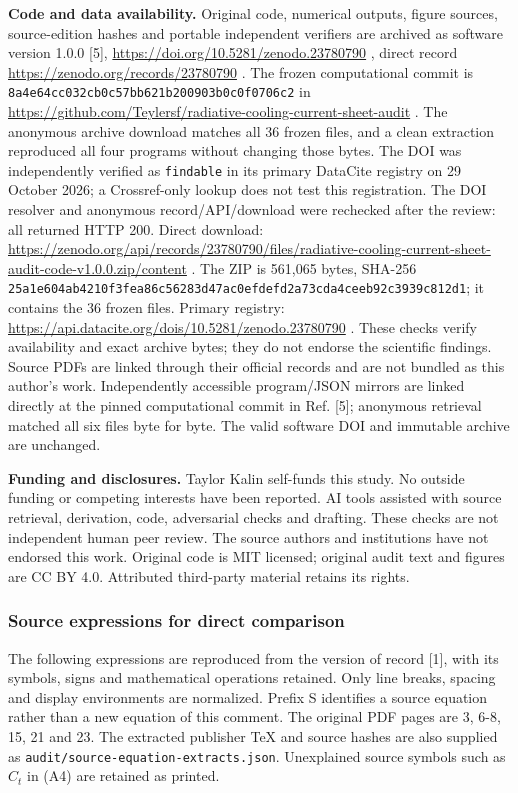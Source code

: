 \textbf{Code and data availability.} Original code, numerical outputs,
figure sources, source-edition hashes and portable independent verifiers
are archived as software version 1.0.0 {[}5{]},
\url{https://doi.org/10.5281/zenodo.23780790} , direct record
\url{https://zenodo.org/records/23780790} . The frozen computational
commit is \nolinkurl{8a4e64cc032cb0c57bb621b200903b0c0f0706c2} in
\url{https://github.com/Teylersf/radiative-cooling-current-sheet-audit}
. The anonymous archive download matches all 36 frozen files, and a
clean extraction reproduced all four programs without changing those
bytes. The DOI was independently verified as \nolinkurl{findable} in its
primary DataCite registry on 29 October 2026; a Crossref-only lookup
does not test this registration. The DOI resolver and anonymous
record/API/download were rechecked after the review: all returned HTTP
200. Direct download:
\url{https://zenodo.org/api/records/23780790/files/radiative-cooling-current-sheet-audit-code-v1.0.0.zip/content}
. The ZIP is 561,065 bytes, SHA-256
\nolinkurl{25a1e604ab4210f3fea86c56283d47ac0efdefd2a73cda4ceeb92c3939c812d1};
it contains the 36 frozen files. Primary registry:
\url{https://api.datacite.org/dois/10.5281/zenodo.23780790} . These
checks verify availability and exact archive bytes; they do not endorse
the scientific findings. Source PDFs are linked through their official
records and are not bundled as this author's work. Independently
accessible program/JSON mirrors are linked directly at the pinned
computational commit in Ref. {[}5{]}; anonymous retrieval matched all
six files byte for byte. The valid software DOI and immutable archive
are unchanged.

\textbf{Funding and disclosures.} Taylor Kalin self-funds this study. No
outside funding or competing interests have been reported. AI tools
assisted with source retrieval, derivation, code, adversarial checks and
drafting. These checks are not independent human peer review. The source
authors and institutions have not endorsed this work. Original code is
MIT licensed; original audit text and figures are CC BY 4.0. Attributed
third-party material retains its rights.

\subsubsection{Source expressions for direct
comparison}\label{source-expressions-for-direct-comparison}

The following expressions are reproduced from the version of record
{[}1{]}, with its symbols, signs and mathematical operations retained.
Only line breaks, spacing and display environments are normalized.
Prefix S identifies a source equation rather than a new equation of this
comment. The original PDF pages are 3, 6-8, 15, 21 and 23. The extracted
publisher TeX and source hashes are also supplied as
\nolinkurl{audit/source-equation-extracts.json}. Unexplained source symbols
such as \(C_t\) in (A4) are retained as printed.


